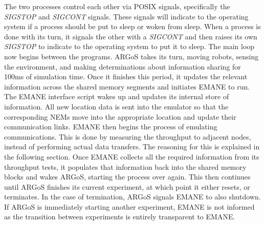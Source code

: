 The two processes control each other via POSIX signals, specifically the \textit{SIGSTOP} and \textit{SIGCONT} signals.
These signals will indicate to the operating system if a process should be put to sleep or woken from sleep.
When a process is done with its turn, it signals the other with a \textit{SIGCONT} and then raises its own \textit{SIGSTOP} to indicate to the operating system to put it to sleep.
The main loop now begins between the programs.
ARGoS takes its turn, moving robots, sensing the environment, and making determinations about information sharing for 100ms of simulation time.
Once it finishes this period, it updates the relevant information across the shared memory segments and initiates EMANE to run.
The EMANE interface script wakes up and updates its internal store of information.
All new location data is sent into the emulator so that the corresponding NEMs move into the appropriate location and update their communication links.
EMANE then begins the process of emulating communications.
This is done by measuring the throughput to adjacent nodes, instead of performing actual data transfers. The reasoning for this is explained in the following section.
Once EMANE collects all the required information from its throughput tests, it populates that information back into the shared memory blocks and wakes ARGoS, starting the process over again.
This then continues until ARGoS finishes its current experiment, at which point it either resets, or terminates.
In the case of termination, ARGoS signals EMANE to also shutdown.
If ARGoS is immediately starting another experiment, EMANE is not informed as the transition between experiments is entirely transparent to EMANE.
